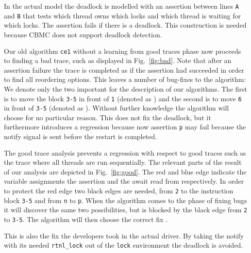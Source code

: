 \documentclass{llncs}
\begin{document}
In the actual model the deadlock is modelled with an assertion
between lines {\tt A} and {\tt B} that
tests which thread owns which locks and which thread is waiting for
which locks. The assertion fails if there is a deadlock. This construction
is needed because CBMC does not support deadlock detection.

Our old algorithm {\tt ce1} without a learning from good traces phase now
proceeds to finding a bad trace, such as 
 displayed
in Fig.~\ref{fig:bad}. Note that after an assertion failure the
trace is completed as if the assertion had succeeded in order to find all
reordering options. This leaves a number of bug-fixes to the algorithm: 
We denote only the two important for the description of our algorithms.
The first is to  move
the block {\tt3-5} in front of {\tt 1} (denoted as )
and the second is to move {\tt6} in front of {\tt3-5} (denoted as ).
Without further knowledge the algorithm will choose  for no
particular reason.
This does not fix the deadlock, but it furthermore introduces a regression because
now assertion {\tt p} may fail because the notify signal is sent before the restart
is completed.

The good trace analysis prevents a regression with respect to good traces
such as the trace where all threads are run sequentially. The relevant parts of the
result of our analysis are depicted in Fig.~\ref{fig:good}.
The red and blue edge indicate the variable assignments the assertion
and the await read from respectively. In order to protect the red edge
two black edges are needed, from {\tt2} to the instruction block
{\tt3-5} and from {\tt n} to {\tt p}. When the algorithm comes to the phase of fixing 
bugs it will discover the same two possibilities, but  is blocked
by the black edge from {\tt2} to {\tt3-5}. The algorithm will then
choose the correct fix .

This is also the fix the developers took in the actual driver.
By taking the notify with its needed {\tt rtnl\_lock} out of the {\tt lock} environment
the deadlock is avoided.
\end{document}
